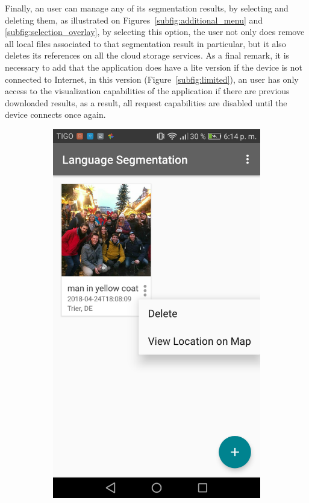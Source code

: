 Finally, an user can manage any of its segmentation results, by selecting and deleting them, as illustrated on Figures~\ref{subfig:additional_menu} and \ref{subfig:selection_overlay}, by selecting this option, the user not only does remove all local files associated to that segmentation result in particular, but it also deletes its references on all the cloud storage services. As a final remark, it is necessary to add that the application does have a lite version if the device is not connected to Internet, in this version (Figure~\ref{subfig:limited}), an user has only access to the visualization capabilities of the application if there are previous downloaded results, as a result, all request capabilities are disabled until the device connects once again.

\begin{figure}[!htbp]
    \centering
    \begin{multicols}{3}
    \begin{subfigure}[b]{\columnwidth}
            \centering
            \includegraphics[width=\textwidth]{./figures/dmn_app/views/15.png}

\end{subfigure}
\end{multicols}
\end{figure}
